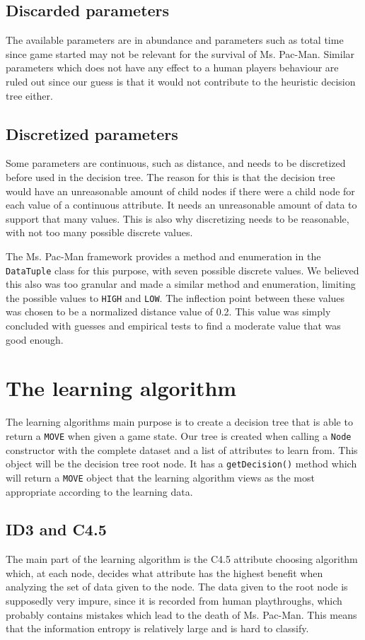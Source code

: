 \documentclass{article}
\begin{document}
    \subsection{Discarded parameters}
    The available parameters are in abundance and parameters such as total time since game started may not be relevant for the survival of Ms. Pac-Man. Similar parameters which does not have any effect to a human players behaviour are ruled out since our guess is that it would not contribute to the heuristic decision tree either.

    \subsection{Discretized parameters}
    Some parameters are continuous, such as distance, and needs to be discretized before used in the decision tree. The reason for this is that the decision tree would have an unreasonable amount of child nodes if there were a child node for each value of a continuous attribute. It needs an unreasonable amount of data to support that many values. This is also why discretizing needs to be reasonable, with not too many possible discrete values.

    The Ms. Pac-Man framework provides a method and enumeration in the \verb|DataTuple| class for this purpose, with seven possible discrete values. We believed this also was too granular and made a similar method and enumeration, limiting the possible values to \verb|HIGH| and \verb|LOW|. The inflection point between these values was chosen to be a normalized distance value of 0.2. This value was simply concluded with guesses and empirical tests to find a moderate value that was good enough.

\section{The learning algorithm}
The learning algorithms main purpose is to create a decision tree that is able to return a \verb|MOVE| when given a game state. Our tree is created when calling a \verb|Node| constructor with the complete dataset and a list of attributes to learn from. This object will be the decision tree root node. It has a \verb|getDecision()| method which will return a \verb|MOVE| object that the learning algorithm views as the most appropriate according to the learning data.

    \subsection{ID3 and C4.5}
    The main part of the learning algorithm is the C4.5 attribute choosing algorithm which, at each node, decides what attribute has the highest benefit when analyzing the set of data given to the node. The data given to the root node is supposedly very impure, since it is recorded from human playthroughs, which probably contains mistakes which lead to the death of Ms. Pac-Man. This means that the information entropy is relatively large and is hard to classify.
\end{document}
